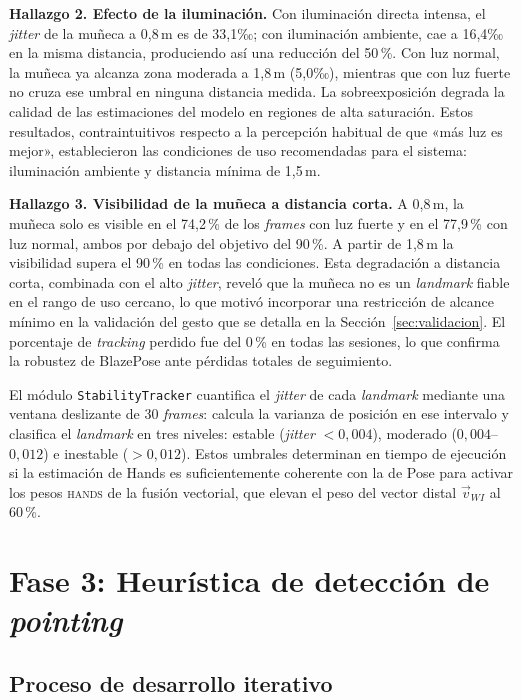 \documentclass[12pt]{report} %
\begin{document}
\textbf{Hallazgo 2. Efecto de la iluminación.} Con iluminación directa intensa, el \textit{jitter} de la muñeca a 0{,}8\,m es de 33{,}1‰; con iluminación ambiente, cae a 16{,}4‰ en la misma distancia, produciendo así una reducción del 50\,\%. Con luz normal, la muñeca ya alcanza zona moderada a 1{,}8\,m (5{,}0‰), mientras que con luz fuerte no cruza ese umbral en ninguna distancia medida. La sobreexposición degrada la calidad de las estimaciones del modelo en regiones de alta saturación. Estos resultados, contraintuitivos respecto a la percepción habitual de que «más luz es mejor», establecieron las condiciones de uso recomendadas para el sistema: iluminación ambiente y distancia mínima de 1{,}5\,m.

\textbf{Hallazgo 3. Visibilidad de la muñeca a distancia corta.} A 0{,}8\,m, la muñeca solo es visible en el 74{,}2\,\% de los \textit{frames} con luz fuerte y en el 77{,}9\,\% con luz normal, ambos por debajo del objetivo del 90\,\%. A partir de 1{,}8\,m la visibilidad supera el 90\,\% en todas las condiciones. Esta degradación a distancia corta, combinada con el alto \textit{jitter}, reveló que la muñeca no es un \textit{landmark} fiable en el rango de uso cercano, lo que motivó incorporar una restricción de alcance mínimo en la validación del gesto que se detalla en la Sección~\ref{sec:validacion}. El porcentaje de \textit{tracking} perdido fue del 0\,\% en todas las sesiones, lo que confirma la robustez de BlazePose ante pérdidas totales de seguimiento.

El módulo \texttt{StabilityTracker} cuantifica el \textit{jitter} de cada \textit{landmark} mediante una ventana deslizante de 30 \textit{frames}: calcula la varianza de posición en ese intervalo y clasifica el \textit{landmark} en tres niveles: estable (\textit{jitter} $< 0{,}004$), moderado ($0{,}004$--$0{,}012$) e inestable ($> 0{,}012$). Estos umbrales determinan en tiempo de ejecución si la estimación de Hands es suficientemente coherente con la de Pose para activar los pesos \textsc{hands} de la fusión vectorial, que elevan el peso del vector distal $\vec{v}_{WI}$ al 60\,\%.

\section{Fase 3: Heurística de detección de \textit{pointing}}

\subsection{Proceso de desarrollo iterativo}
\label{sec:fase3_iterativo}
\end{document}
